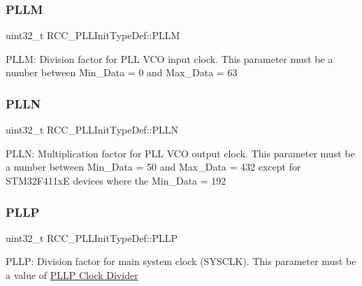 \subsubsection{\texorpdfstring{P\+L\+LM}{PLLM}}
{\footnotesize\ttfamily uint32\+\_\+t R\+C\+C\+\_\+\+P\+L\+L\+Init\+Type\+Def\+::\+P\+L\+LM}

P\+L\+LM\+: Division factor for P\+LL V\+CO input clock. This parameter must be a number between Min\+\_\+\+Data = 0 and Max\+\_\+\+Data = 63 \mbox{\label{struct_r_c_c___p_l_l_init_type_def_a2482608639ebfffc51a41135c979369b}} 
\subsubsection{\texorpdfstring{P\+L\+LN}{PLLN}}
{\footnotesize\ttfamily uint32\+\_\+t R\+C\+C\+\_\+\+P\+L\+L\+Init\+Type\+Def\+::\+P\+L\+LN}

P\+L\+LN\+: Multiplication factor for P\+LL V\+CO output clock. This parameter must be a number between Min\+\_\+\+Data = 50 and Max\+\_\+\+Data = 432 except for S\+T\+M32\+F411xE devices where the Min\+\_\+\+Data = 192 \mbox{\label{struct_r_c_c___p_l_l_init_type_def_a4ecedf3ef401fa564aa636824fc3ded0}} 
\subsubsection{\texorpdfstring{P\+L\+LP}{PLLP}}
{\footnotesize\ttfamily uint32\+\_\+t R\+C\+C\+\_\+\+P\+L\+L\+Init\+Type\+Def\+::\+P\+L\+LP}

P\+L\+LP\+: Division factor for main system clock (S\+Y\+S\+C\+LK). This parameter must be a value of \hyperlink{group___r_c_c___p_l_l_p___clock___divider}{P\+L\+LP Clock Divider} \mbox{\label{struct_r_c_c___p_l_l_init_type_def_a2b69dfec4b8ab52d649a71d141892691}} 
